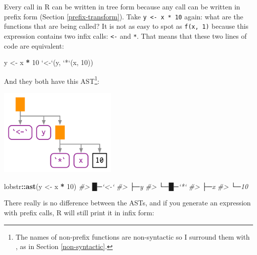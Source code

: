 \documentclass[]{book}
\newenvironment{Shaded}{\begin{snugshade}}{\end{snugshade}}
\newcommand{\CommentTok}[1]{\textcolor[rgb]{0.37,0.37,0.37}{\textit{#1}}}
\newcommand{\DataTypeTok}[1]{\textcolor[rgb]{0.27,0.27,0.27}{#1}}
\newcommand{\DecValTok}[1]{\textcolor[rgb]{0.06,0.06,0.06}{#1}}
\newcommand{\KeywordTok}[1]{\textcolor[rgb]{0.27,0.27,0.27}{\textbf{#1}}}
\newcommand{\NormalTok}[1]{#1}
\newcommand{\OperatorTok}[1]{\textcolor[rgb]{0.43,0.43,0.43}{\textbf{#1}}}
\newcommand{\StringTok}[1]{\textcolor[rgb]{0.5,0.5,0.5}{#1}}
\let\rmarkdownfootnote\footnote%
\def\footnote{\protect\rmarkdownfootnote}
\begin{document}

Every call in R can be written in tree form because any call can be written in prefix form (Section \ref{prefix-transform}). Take \texttt{y\ \textless{}-\ x\ *\ 10} again: what are the functions that are being called? It is not as easy to spot as \texttt{f(x,\ 1)} because this expression contains two infix calls: \texttt{\textless{}-} and \texttt{*}. That means that these two lines of code are equivalent:

\begin{Shaded}
\begin{Highlighting}[]
\NormalTok{y <-}\StringTok{ }\NormalTok{x }\OperatorTok{*}\StringTok{ }\DecValTok{10}
\StringTok{`}\DataTypeTok{<-}\StringTok{`}\NormalTok{(y, }\StringTok{`}\DataTypeTok{*}\StringTok{`}\NormalTok{(x, }\DecValTok{10}\NormalTok{))}
\end{Highlighting}
\end{Shaded}

And they both have this AST\footnote{The names of non-prefix functions are non-syntactic so I surround them with \texttt{\textasciigrave{}\textasciigrave{}}, as in Section \ref{non-syntactic}.}:

\begin{center}\includegraphics[width=2.26in]{diagrams/expressions/prefix} \end{center}

\begin{Shaded}
\begin{Highlighting}[]
\NormalTok{lobstr}\OperatorTok{::}\KeywordTok{ast}\NormalTok{(y <-}\StringTok{ }\NormalTok{x }\OperatorTok{*}\StringTok{ }\DecValTok{10}\NormalTok{)}
\CommentTok{#> █─`<-` }
\CommentTok{#> ├─y }
\CommentTok{#> └─█─`*` }
\CommentTok{#>   ├─x }
\CommentTok{#>   └─10}
\end{Highlighting}
\end{Shaded}

There really is no difference between the ASTs, and if you generate an expression with prefix calls, R will still print it in infix form:
\end{document}

